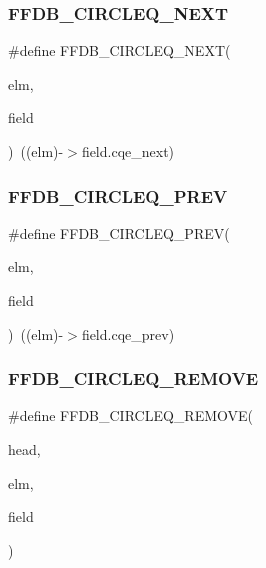 \subsubsection{\texorpdfstring{FFDB\_CIRCLEQ\_NEXT}{FFDB\_CIRCLEQ\_NEXT}}
{\footnotesize\ttfamily \#define F\+F\+D\+B\+\_\+\+C\+I\+R\+C\+L\+E\+Q\+\_\+\+N\+E\+XT(\begin{DoxyParamCaption}\item[{}]{elm,  }\item[{}]{field }\end{DoxyParamCaption})~((elm)-\/$>$field.\+cqe\+\_\+next)}

\mbox{\label{adat-devel_2other__libs_2filedb_2filehash_2ffdb__cq_8h_a226485de8e066a661a6ce61802a7376d}} 
\subsubsection{\texorpdfstring{FFDB\_CIRCLEQ\_PREV}{FFDB\_CIRCLEQ\_PREV}}
{\footnotesize\ttfamily \#define F\+F\+D\+B\+\_\+\+C\+I\+R\+C\+L\+E\+Q\+\_\+\+P\+R\+EV(\begin{DoxyParamCaption}\item[{}]{elm,  }\item[{}]{field }\end{DoxyParamCaption})~((elm)-\/$>$field.\+cqe\+\_\+prev)}

\mbox{\label{adat-devel_2other__libs_2filedb_2filehash_2ffdb__cq_8h_ab6b5bebfa767832844cc276764fe4b60}} 
\subsubsection{\texorpdfstring{FFDB\_CIRCLEQ\_REMOVE}{FFDB\_CIRCLEQ\_REMOVE}}
{\footnotesize\ttfamily \#define F\+F\+D\+B\+\_\+\+C\+I\+R\+C\+L\+E\+Q\+\_\+\+R\+E\+M\+O\+VE(\begin{DoxyParamCaption}\item[{}]{head,  }\item[{}]{elm,  }\item[{}]{field }\end{DoxyParamCaption})}

